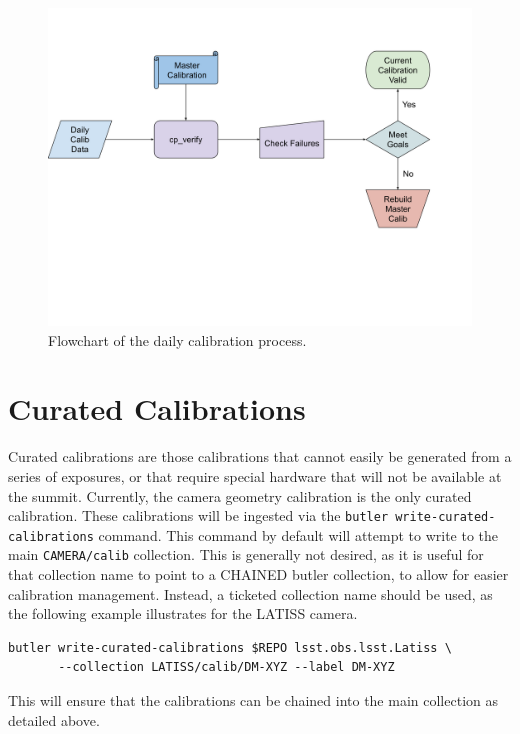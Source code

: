 \documentclass[DM,authoryear,toc]{lsstdoc}
\begin{document}
\begin{figure}
  \includegraphics[width=\linewidth]{figures/daily_processing.png}
  \caption{Flowchart of the daily calibration process.}
  \label{fig:daily}
\end{figure}

\section{Curated Calibrations}

Curated calibrations are those calibrations that cannot easily be generated from a series of exposures, or that require special hardware that will not be available at the summit.  Currently, the camera geometry calibration is the only curated calibration.   These calibrations will be ingested via the \verb|butler write-curated-calibrations| command.  This command by default will attempt to write to the main \verb|CAMERA/calib| collection.  This is generally not desired, as it is useful for that collection name to point to a CHAINED butler collection, to allow for easier calibration management.  Instead, a ticketed collection name should be used, as the following example illustrates for the LATISS camera.

\begin{verbatim}
butler write-curated-calibrations $REPO lsst.obs.lsst.Latiss \
       --collection LATISS/calib/DM-XYZ --label DM-XYZ
\end{verbatim}

This will ensure that the calibrations can be chained into the main collection as detailed above.
\end{document}
